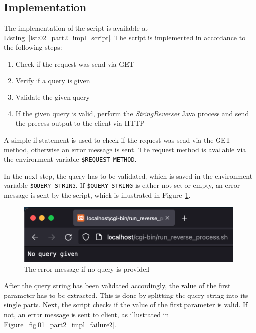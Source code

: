\documentclass{article}
\def\Fig#1{Figure~\ref{#1}}
\def\Lst#1{Listing~\ref{#1}}
\begin{document}
\subsection{Implementation}\label{subsec:02_part2_impl}
The implementation of the script is available at \Lst{lst:02_part2_impl_script}.
The script is implemented in accordance to the following steps:
\begin{enumerate}
\item Check if the request was send via GET
\item Verify if a query is given
\item Validate the given query
\item If the given query is valid, perform the \textit{StringReverser} Java process and send the process output to the client via HTTP
\end{enumerate}

A simple if statement is used to check if the request was send via the GET method, otherwise an error message is sent. The request method is available via the environment variable \texttt{\$REQUEST\_METHOD}.


In the next step, the query has to be validated, which is saved in the environment variable \texttt{\$QUERY\_STRING}. If \texttt{\$QUERY\_STRING} is either not set or empty, an error message is sent by the script, which is illustrated in \Fig{fig:01_part2_impl_failure1}.

\begin{figure}[h]
\centering
\includegraphics[scale=0.6]{images/part2Failure1}
\caption{The error message if no query is provided}
\label{fig:01_part2_impl_failure1}
\end{figure}

After the query string has been validated accordingly, the value of the first parameter has to be extracted. This is done by splitting the query string into its single parts. Next, the script checks if the value of the first parameter is valid. If not, an error message is sent to client, as illustrated in \Fig{fig:01_part2_impl_failure2}.
\end{document}
